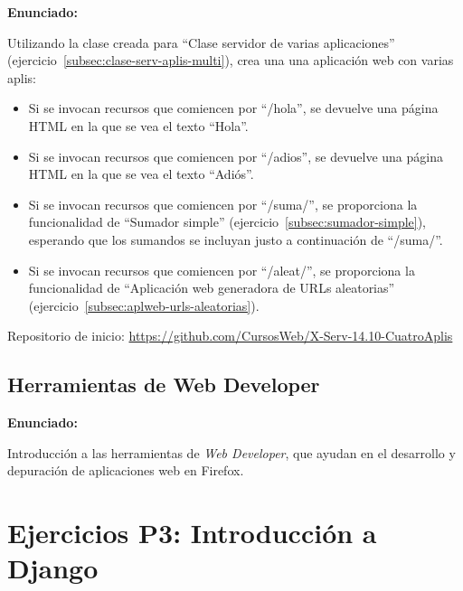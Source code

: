 \textbf{Enunciado:}

Utilizando la clase creada para ``Clase servidor de varias aplicaciones'' (ejercicio~\ref{subsec:clase-serv-aplis-multi}), crea una una aplicación web con varias aplis:

\begin{itemize}
\item Si se invocan recursos que comiencen por ``/hola'', se devuelve una página HTML en la que se vea el texto ``Hola''.
\item Si se invocan recursos que comiencen por ``/adios'', se devuelve una página HTML en la que se vea el texto ``Adiós''.
\item Si se invocan recursos que comiencen por ``/suma/'', se proporciona la funcionalidad de ``Sumador simple'' (ejercicio~\ref{subsec:sumador-simple}), esperando que los sumandos se incluyan justo a continuación de ``/suma/''.
\item Si se invocan recursos que comiencen por ``/aleat/'', se proporciona la funcionalidad de ``Aplicación web generadora de URLs aleatorias'' (ejercicio~\ref{subsec:aplweb-urls-aleatorias}).
\end{itemize}

Repositorio de inicio: \url{https://github.com/CursosWeb/X-Serv-14.10-CuatroAplis}

\subsection{Herramientas de Web Developer}
\label{subsec:inst-web-developer}

\textbf{Enunciado:}

Introducción a las herramientas de \emph{Web Developer}, que ayudan en el desarrollo
y depuración de aplicaciones web en Firefox.

\section{Ejercicios P3: Introducción a Django}

